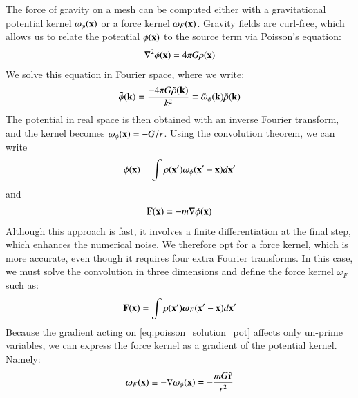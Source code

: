 The force of gravity on a mesh can be computed either with a gravitational potential  kernel $\omega_{\phi} ({\bf x})$
  or a force  kernel $\omega_{F} ({\bf x})$.
Gravity fields are curl-free, which allows us to relate the potential $\phi({\bf x})$ to the source term via Poisson's equation: 
\begin{eqnarray}
\nabla^{2}\phi({\bf x}) = 4 \pi G \rho({\bf x})
\label{eq:poisson}
\end{eqnarray}
We solve this equation in Fourier space, where we write:
\begin{eqnarray}
 \tilde{\phi}({\bf k}) = \frac{-4 \pi G \tilde{\rho}({\bf k})}{k^{2}} \equiv \tilde{\omega}_{\phi}({\bf k})\tilde{\rho}({\bf k})
\label{eq:poissonFourier}
\end{eqnarray}
The potential in real space is then obtained with an inverse Fourier transform, and the kernel becomes $\omega_{\phi} ({\bf x}) = -G/r$.
Using the convolution theorem, we can write
\begin{eqnarray}
 \phi({\bf x}) = \int \rho({\bf x'}) \omega_{\phi}({\bf x'} - {\bf x}) d{\bf x'}   
\label{eq:poisson_solution_pot}
\end{eqnarray}
and
\begin{eqnarray}
{\bf F}({\bf x}) = - m {\bf \nabla} \phi({\bf x}) 
\label{eq:Force_sol}
\end{eqnarray}
Although this approach is fast, it involves a finite differentiation at the final step, which enhances the numerical noise.
We therefore opt for a force kernel, which is more accurate, even though it requires four extra Fourier transforms.
In this case, we must solve the convolution in three dimensions and define the force kernel {\boldmath $\omega$}$_{F}$ such as:
\begin{eqnarray}
 {\bf F}({\bf x}) =  \int \rho({\bf x'}) \mbox{\boldmath $\omega$}_{F}({\bf x'} - {\bf x}) d{\bf x'}                                      
\label{eq:poisson_solution_force}
\end{eqnarray}
Because the gradient acting on \ref{eq:poisson_solution_pot} affects only un-prime variables, we can express the force kernel as a gradient of the potential kernel. Namely:  
\begin{eqnarray}
\mbox{\boldmath $\omega$}_{F}({\bf x}) \equiv - {\bf \nabla}\omega_{\phi}({\bf x}) = - \frac{mG \hat{\bf r}}{r^{2}}
\end{eqnarray}

